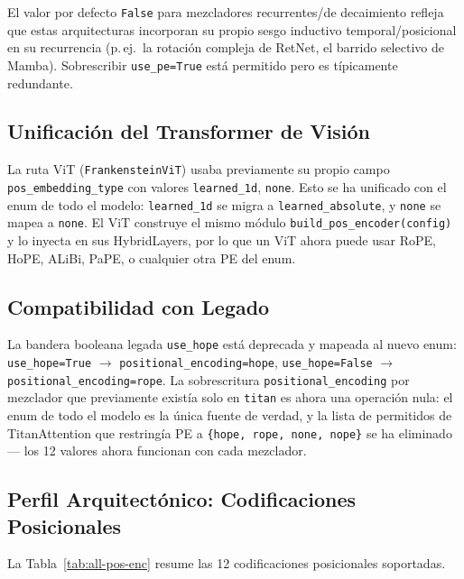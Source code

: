 El valor por defecto \texttt{False} para mezcladores recurrentes/de
decaimiento refleja que estas arquitecturas incorporan su propio sesgo
inductivo temporal/posicional en su recurrencia (p.\,ej.\ la rotación
compleja de RetNet, el barrido selectivo de Mamba). Sobrescribir
\texttt{use\_pe=True} está permitido pero es típicamente redundante.

\subsection{Unificación del Transformer de Visión}

La ruta ViT (\texttt{FrankensteinViT}) usaba previamente su propio campo
\texttt{pos\_embedding\_type} con valores \texttt{learned\_1d},
\texttt{none}. Esto se ha unificado con el enum de todo el modelo:
\texttt{learned\_1d} se migra a \texttt{learned\_absolute}, y
\texttt{none} se mapea a \texttt{none}. El ViT construye el mismo módulo
\texttt{build\_pos\_encoder(config)} y lo inyecta en sus HybridLayers,
por lo que un ViT ahora puede usar RoPE, HoPE, ALiBi, PaPE, o cualquier
otra PE del enum.

\subsection{Compatibilidad con Legado}

La bandera booleana legada \texttt{use\_hope} está deprecada y mapeada al
nuevo enum: \texttt{use\_hope=True} $\to$
\texttt{positional\_encoding=hope}, \texttt{use\_hope=False} $\to$
\texttt{positional\_encoding=rope}. La sobrescritura
\texttt{positional\_encoding} por mezclador que previamente existía solo
en \texttt{titan} es ahora una operación nula: el enum de todo el
modelo es la única fuente de verdad, y la lista de permitidos de
TitanAttention que restringía PE a \texttt{\{hope, rope, none, nope\}} se
ha eliminado --- los 12 valores ahora funcionan con cada mezclador.

\subsection{Perfil Arquitectónico: Codificaciones Posicionales}

La Tabla~\ref{tab:all-pos-enc} resume las 12 codificaciones posicionales
soportadas.

